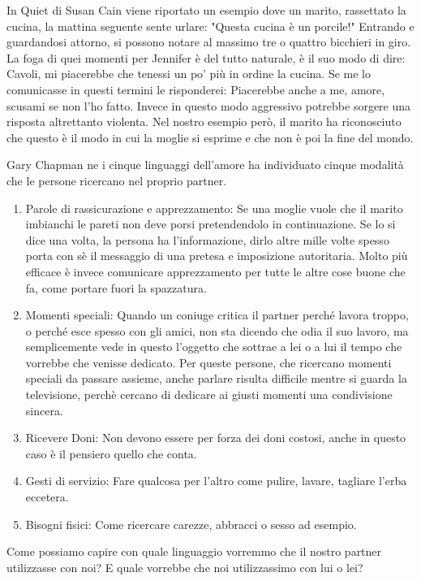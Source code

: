 \documentclass[12pt]{book} %
\begin{document}
In Quiet di Susan Cain viene riportato un esempio dove un marito,
rassettato la cucina, la mattina seguente sente urlare: "Questa cucina è un porcile!" Entrando e
guardandosi attorno, si possono notare al massimo tre o quattro bicchieri in giro. La foga di quei momenti per Jennifer
è del tutto naturale, è il suo modo di dire: Cavoli, mi piacerebbe che tenessi un po' più in ordine la cucina. Se me lo
comunicasse in questi termini le risponderei: Piacerebbe anche a me, amore, scusami se non l'ho fatto. Invece in questo
modo aggressivo potrebbe sorgere una risposta altrettanto violenta. Nel nostro esempio però, il marito ha
riconosciuto che questo è il modo in cui la moglie si esprime e che non è poi la fine del mondo.

Gary Chapman ne i cinque linguaggi dell'amore ha individuato cinque
modalità che le persone ricercano nel proprio partner.

\begin{enumerate}
\item Parole di rassicurazione e apprezzamento: Se una moglie vuole che il marito imbianchi le pareti non deve porsi
pretendendolo in continuazione. Se lo si dice una volta, la persona ha l'informazione, dirlo altre mille volte spesso porta con sè il messaggio di una pretesa e imposizione autoritaria. Molto più efficace è invece comunicare apprezzamento per tutte le altre
cose buone che fa, come portare fuori la spazzatura.
\item Momenti speciali: Quando un coniuge critica il partner perché lavora troppo, o perché esce spesso con gli amici,
non sta dicendo che odia il suo lavoro, ma semplicemente vede in questo l'oggetto che sottrae a
lei o a lui il tempo che vorrebbe che venisse dedicato. Per queste persone, che ricercano momenti speciali da passare
assieme, anche parlare risulta difficile mentre si guarda la televisione, perchè cercano di dedicare ai giusti momenti una condivisione sincera.
\item Ricevere Doni: Non devono essere per forza dei doni costosi, anche in questo caso è il pensiero quello che conta.
\item Gesti di servizio: Fare qualcosa per l'altro come pulire, lavare, tagliare l'erba eccetera.
\item Bisogni fisici: Come ricercare carezze, abbracci o sesso ad esempio. 
\end{enumerate}
Come possiamo capire con quale linguaggio vorremmo che il nostro partner utilizzasse con noi? E quale vorrebbe che noi
utilizzassimo con lui o lei?
\end{document}
